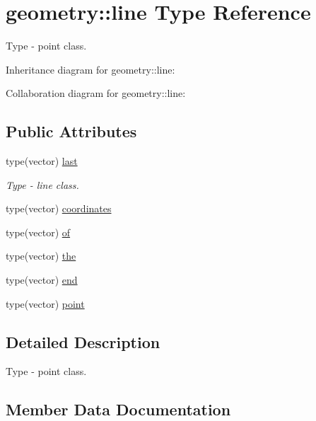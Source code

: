 \hypertarget{structgeometry_1_1line}{}\section{geometry\+:\+:line Type Reference}
\label{structgeometry_1_1line}


Type -\/ point class.  




Inheritance diagram for geometry\+:\+:line\+:


Collaboration diagram for geometry\+:\+:line\+:
\subsection*{Public Attributes}
\begin{DoxyCompactItemize}
\item 
type(vector) \mbox{\hyperlink{structgeometry_1_1line_ab899fb3b6da58896cd14e2f1a474c457}{last}}
\begin{DoxyCompactList}\small\item\em Type -\/ line class. \end{DoxyCompactList}\item 
type(vector) \mbox{\hyperlink{structgeometry_1_1line_a80238f3749a81a1baecb3b2bd905124f}{coordinates}}
\item 
type(vector) \mbox{\hyperlink{structgeometry_1_1line_a749dd45a3d15e44c1c315e154e7b2c01}{of}}
\item 
type(vector) \mbox{\hyperlink{structgeometry_1_1line_a5afd4d15030233739e7a7dee4fb8d9cb}{the}}
\item 
type(vector) \mbox{\hyperlink{structgeometry_1_1line_abb0cc12686d150b6b47d1aeee924cbd9}{end}}
\item 
type(vector) \mbox{\hyperlink{structgeometry_1_1line_aabed6f891c1d56c5df75e4d63ce63cdf}{point}}
\end{DoxyCompactItemize}


\subsection{Detailed Description}
Type -\/ point class. 

\subsection{Member Data Documentation}
\mbox{\label{structgeometry_1_1line_a80238f3749a81a1baecb3b2bd905124f}} 
